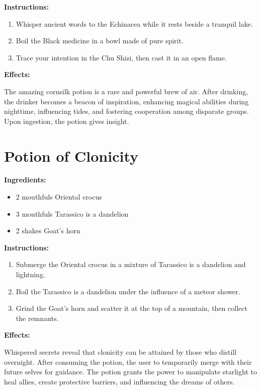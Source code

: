 \documentclass{article}
\begin{document}
\textbf{Instructions:}

\begin{enumerate}
  \item Whisper ancient words to the Echinacea while it rests beside a tranquil lake.
  \item Boil the Black medicine in a bowl made of pure spirit.
  \item Trace your intention in the Chu Shizi, then cast it in an open flame.
\end{enumerate}

\textbf{Effects:}

The amazing cornsilk potion is a rare and powerful brew of air. After drinking, the drinker becomes a beacon of inspiration, enhancing magical abilities during nighttime, influencing tides, and fostering cooperation among disparate groups. Upon ingestion, the potion gives insight.

\newpage
\section*{Potion of Clonicity}

\textbf{Ingredients:}

\begin{itemize}
  \item 2 mouthfuls Oriental crocus
  \item 3 mouthfuls Tarassico is a dandelion
  \item 2 shakes Goat's horn
\end{itemize}

\textbf{Instructions:}

\begin{enumerate}
  \item Submerge the Oriental crocus in a mixture of Tarassico is a dandelion and lightning.
  \item Boil the Tarassico is a dandelion under the influence of a meteor shower.
  \item Grind the Goat's horn and scatter it at the top of a mountain, then collect the remnants.
\end{enumerate}

\textbf{Effects:}

Whispered secrets reveal that clonicity can be attained by those who distill overnight. After consuming the potion, the user to temporarily merge with their future selves for guidance. The potion grants the power to manipulate starlight to heal allies, create protective barriers, and influencing the dreams of others.
\end{document}
